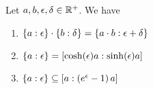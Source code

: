 \begin{theorem} \label{thm:multiplicative:rules}
  Let $a,b,\epsilon,\delta \in\Rplus$. We have

  \begin{enumerate}
    \item $\ean[\epsilon]{a} \cdot \ean[\delta]{b} = \ean[\epsilon+\delta]{a\cdot b}$
    \item $\ean[\epsilon]{a} = \an[\sinh(\epsilon)a]{\cosh(\epsilon)a}$
    \item $\ean[\epsilon]{a} \subseteq \an[\left(e^\epsilon-1\right)a]{a}$
  \end{enumerate}
\end{theorem}
